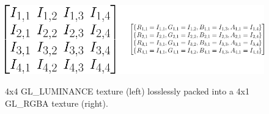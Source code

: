 \begin{figure}[ht!]
\begin{center}
\includegraphics[height=0.22\textwidth]{fig/pixel_pack}\\
\caption{4x4 GL\_LUMINANCE texture (left) losslessly packed into a 4x1 GL\_RGBA texture (right).}
\label{fig_pixel_pack}
\end{center}
\end{figure}
